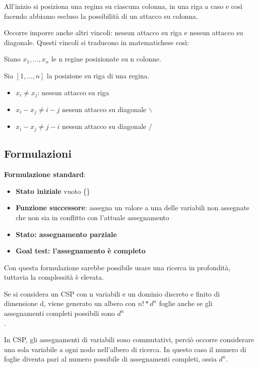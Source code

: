 All'inizio si posiziona una regina su ciascuna colonna, in una riga a caso e
così facendo abbiamo escluso la possibilità di un attacco su colonna.

Occorre imporre anche altri vincoli: nessun attacco su riga e nessun attacco su
diagonale. Questi vincoli si traducono in matematichese così:

Siano $x_1,...,x_n$ le n regine posizionate su n colonne.

Sia $[1,...,n]$ la posizione su riga di una regina.

\begin{itemize}
 \item $x_i \neq x_j$: nessun attacco su riga
 \item $x_i - x_j \neq i-j$ nessun attacco su diagonale $\backslash$
 \item $x_i - x_j \neq j-i$ nessun attacco su diagonale $/$
\end{itemize}

\subsection{Formulazioni}

\textbf{Formulazione standard}:

\begin{itemize}
 \item \textbf{Stato iniziale} vuoto \{\}
 \item \textbf{Funzione successore}: assegna un valore a una delle
variabili non assegnate che non sia in conflitto con l'attuale assegnamento
 \item \textbf{Stato: assegnamento parziale}
 \item \textbf{Goal test: l'assegnamento è completo}
\end{itemize}

Con questa formulazione sarebbe possibile usare una ricerca in profondità, tuttavia
la complessità è elevata.

Se si considera un CSP con n variabili e un dominio discreto e finito di
dimensione d, viene generato un albero con $n!*d^n$ foglie anche se gli
assegnamenti completi possibili sono $d^n$\\.

In CSP, gli assegnamenti di variabili sono commutativi, perciò occorre
considerare una sola variabile a ogni nodo nell'albero di ricerca.
In questo caso il numero di foglie diventa pari al numero possibile di
assegnamenti completi, ossia $d^n$.

